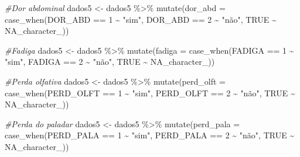 \documentclass[
]{article}
\newenvironment{Shaded}{\begin{snugshade}}{\end{snugshade}}
\newcommand{\AttributeTok}[1]{\textcolor[rgb]{0.77,0.63,0.00}{#1}}
\newcommand{\CommentTok}[1]{\textcolor[rgb]{0.56,0.35,0.01}{\textit{#1}}}
\newcommand{\ConstantTok}[1]{\textcolor[rgb]{0.00,0.00,0.00}{#1}}
\newcommand{\DecValTok}[1]{\textcolor[rgb]{0.00,0.00,0.81}{#1}}
\newcommand{\FunctionTok}[1]{\textcolor[rgb]{0.00,0.00,0.00}{#1}}
\newcommand{\NormalTok}[1]{#1}
\newcommand{\OtherTok}[1]{\textcolor[rgb]{0.56,0.35,0.01}{#1}}
\newcommand{\SpecialCharTok}[1]{\textcolor[rgb]{0.00,0.00,0.00}{#1}}
\newcommand{\StringTok}[1]{\textcolor[rgb]{0.31,0.60,0.02}{#1}}
\begin{document}
\begin{Shaded}
\begin{Highlighting}[]
\CommentTok{\#Dor abdominal}
\NormalTok{dados5 }\OtherTok{\textless{}{-}}\NormalTok{  dados5 }\SpecialCharTok{\%\textgreater{}\%}
  \FunctionTok{mutate}\NormalTok{(}\AttributeTok{dor\_abd =} \FunctionTok{case\_when}\NormalTok{(DOR\_ABD }\SpecialCharTok{==} \DecValTok{1} \SpecialCharTok{\textasciitilde{}} \StringTok{"sim"}\NormalTok{,}
\NormalTok{                             DOR\_ABD }\SpecialCharTok{==} \DecValTok{2} \SpecialCharTok{\textasciitilde{}} \StringTok{"não"}\NormalTok{,}
                             \ConstantTok{TRUE} \SpecialCharTok{\textasciitilde{}} \ConstantTok{NA\_character\_}\NormalTok{))}

\CommentTok{\#Fadiga}
\NormalTok{dados5 }\OtherTok{\textless{}{-}}\NormalTok{  dados5 }\SpecialCharTok{\%\textgreater{}\%}
  \FunctionTok{mutate}\NormalTok{(}\AttributeTok{fadiga =} \FunctionTok{case\_when}\NormalTok{(FADIGA }\SpecialCharTok{==} \DecValTok{1} \SpecialCharTok{\textasciitilde{}} \StringTok{"sim"}\NormalTok{,}
\NormalTok{                            FADIGA }\SpecialCharTok{==} \DecValTok{2} \SpecialCharTok{\textasciitilde{}} \StringTok{"não"}\NormalTok{,}
                            \ConstantTok{TRUE} \SpecialCharTok{\textasciitilde{}} \ConstantTok{NA\_character\_}\NormalTok{))}

\CommentTok{\#Perda olfativa}
\NormalTok{dados5 }\OtherTok{\textless{}{-}}\NormalTok{  dados5 }\SpecialCharTok{\%\textgreater{}\%}
  \FunctionTok{mutate}\NormalTok{(}\AttributeTok{perd\_olft =} \FunctionTok{case\_when}\NormalTok{(PERD\_OLFT }\SpecialCharTok{==} \DecValTok{1} \SpecialCharTok{\textasciitilde{}} \StringTok{"sim"}\NormalTok{,}
\NormalTok{                               PERD\_OLFT }\SpecialCharTok{==} \DecValTok{2} \SpecialCharTok{\textasciitilde{}} \StringTok{"não"}\NormalTok{,}
                               \ConstantTok{TRUE} \SpecialCharTok{\textasciitilde{}} \ConstantTok{NA\_character\_}\NormalTok{))}

\CommentTok{\#Perda do paladar}
\NormalTok{dados5 }\OtherTok{\textless{}{-}}\NormalTok{  dados5 }\SpecialCharTok{\%\textgreater{}\%}
  \FunctionTok{mutate}\NormalTok{(}\AttributeTok{perd\_pala =} \FunctionTok{case\_when}\NormalTok{(PERD\_PALA }\SpecialCharTok{==} \DecValTok{1} \SpecialCharTok{\textasciitilde{}} \StringTok{"sim"}\NormalTok{,}
\NormalTok{                               PERD\_PALA }\SpecialCharTok{==} \DecValTok{2} \SpecialCharTok{\textasciitilde{}} \StringTok{"não"}\NormalTok{,}
                               \ConstantTok{TRUE} \SpecialCharTok{\textasciitilde{}} \ConstantTok{NA\_character\_}\NormalTok{))}
\end{Highlighting}
\end{Shaded}
\end{document}
